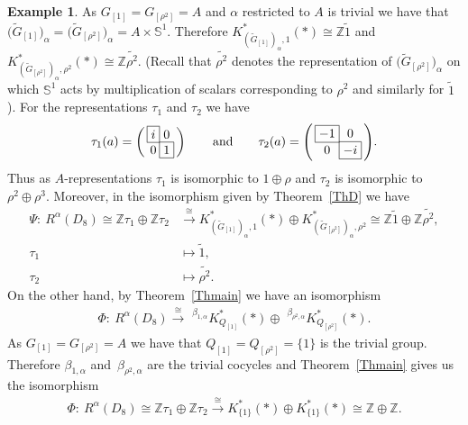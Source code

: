 \documentclass[pdftex]{sigma}
\def\Z{\mathbb{Z}}
\def\S{\mathbb{S}}
\theoremstyle{definition}
\newtheorem{Ex}[Th]{Example}
\numberwithin{equation}{section}
\begin{document}
\begin{Ex}
As $G_{[1]}=G_{[\rho^{2}]}=A$ and $\alpha$ restricted to $A$ is trivial we have that
$\big(\widetilde{G}_{[1]}\big)_{\alpha}=\big(\widetilde{G}_{[\rho^{2}]}\big)_{\alpha}=A\times \S^{1}$.
Therefore $K^{\ast}_{(\widetilde{G}_{[1]})_{\alpha},1}(\ast)\cong \Z\tilde{1}$ and
$K^{\ast}_{(\widetilde{G}_{[\rho^{2}]})_{\alpha},\rho^{2}}(\ast)\cong \Z\tilde{\rho^{2}}$.
(Recall that $\tilde{\rho^{2}}$ denotes the representation of
$\big(\widetilde{G}_{[\rho^{2}]}\big)_{\alpha}$ on which $\S^{1}$ acts by multiplication of
scalars corresponding to $\rho^{2}$ and similarly for $\tilde{1}$).
For the representations $\tau_{1}$ and $\tau_{2}$ we have
 \begin{gather*}
 \arraycolsep=-.05ex
\tau_{1}(a)=
\left(\,\begin{matrix}
 \fbox{$i$} &0 \\[-.2ex]
 0 &\fbox{1}
 \end{matrix}\,\right) \qquad\text{and}\qquad
\tau_{2}(a)=
\left(\,\begin{matrix}
 \fbox{$-1$} &0 \\[-.2ex]
 0 & \fbox{$-i$}
 \end{matrix}\,\right)\!.
 \end{gather*}
Thus as $A$-representations $\tau_{1}$ is isomorphic to $1\oplus \rho$ and
$\tau_{2}$ is isomorphic to $\rho^{2}\oplus\rho^{3}$.
Moreover, in the isomorphism given by Theorem~\ref{ThD} we have
\begin{align*}
\Psi\colon\ R^{\alpha}(D_{8})\cong \Z\tau_{1}\oplus\Z\tau_{2}
&\stackrel{\cong}{\rightarrow} K^{\ast}_{(\widetilde{G}_{[1]})_{\alpha},1}(\ast)\oplus
K^{\ast}_{(\widetilde{G}_{[\rho^{2}]})_{\alpha},\rho^{2}}\cong
\Z{\tilde{1}}\oplus \Z\tilde{\rho^{2}},
\\
\tau_{1}&\mapsto \tilde{1},
\\
\tau_{2}&\mapsto \tilde{\rho^{2}}.
\end{align*}
On the other hand, by Theorem~\ref{Thmain} we have an isomorphism
\begin{gather*}
\Phi\colon\ R^{\alpha}(D_{8})\stackrel{\cong }{\rightarrow} \phantom{i}
^{\beta_{1,\alpha}}K^{\ast}_{Q_{[1]}}(\ast)\oplus \phantom{i}
^{\beta_{\rho^{2},\alpha}}K^{\ast}_{Q_{[\rho^{2}]}}(\ast).
\end{gather*}
As $G_{[1]}=G_{[\rho^{2}]}=A$ we have that $Q_{[1]}=Q_{[\rho^{2}]}=\{1\}$ is the
trivial group. Therefore $\beta_{1,\alpha}$ and~$\beta_{\rho^{2},\alpha}$ are
the trivial cocycles and Theorem~\ref{Thmain} gives us the isomorphism
\begin{gather*}
\Phi\colon\ R^{\alpha}(D_{8})\cong \Z\tau_{1}\oplus\Z\tau_{2} \stackrel{\cong}{\rightarrow}
K^{\ast}_{\{1\}}(\ast)\oplus K^{\ast}_{\{1\}}(\ast)\cong \Z\oplus \Z.
\end{gather*}
\end{Ex}
\end{document}
